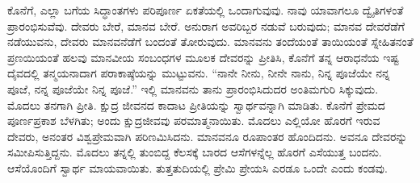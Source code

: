 ಕೊನೆಗೆ, ಎಲ್ಲಾ ಬಗೆಯ ಸಿದ್ಧಾಂತಗಳು ಪರಿಪೂರ್ಣ ಏಕತೆಯಲ್ಲಿ ಒಂದಾಗುವುವು. ನಾವು ಯಾವಾಗಲೂ ದ್ವೈತಿಗಳಂತೆ ಪ್ರಾರಂಭಿಸುವೆವು. ದೇವರು ಬೇರೆ, ಮಾನವ ಬೇರೆ. ಅನುರಾಗ ಅವರಿಬ್ಬರ ನಡುವೆ ಬರುವುದು; ಮಾನವ ದೇವರೆಡೆಗೆ ನಡೆಯುವನು, ದೇವರು ಮಾನವನೆಡೆಗೆ ಬಂದಂತೆ ತೋರುವುದು. ಮಾನವನು ತಂದೆಯಂತೆ ತಾಯಿಯಂತೆ ಸ್ನೇಹಿತನಂತೆ ಪ್ರಣಯಿಯಂತೆ ಹಲವು ಮಾನವೀಯ ಸಂಬಂಧಗಳ ಮೂಲಕ ದೇವರನ್ನು ಪ್ರೀತಿಸಿ, ಕೊನೆಗೆ ತನ್ನ ಆರಾಧನೆಯ ಇಷ್ಟ ದೈವದಲ್ಲಿ ತನ್ಮಯನಾದಾಗ ಪರಾಕಾಷ್ಠೆಯನ್ನು ಮುಟ್ಟುವನು. “ನಾನೇ ನೀನು, ನೀನೇ ನಾನು, ನಿನ್ನ ಪೂಜೆಯೇ ನನ್ನ ಪೂಜೆ, ನನ್ನ ಪೂಜೆಯೇ ನಿನ್ನ ಪೂಜೆ.” ಇಲ್ಲಿ ಮಾನವನು ತಾನು ಪ್ರಾರಂಭಿಸಿದುದರ ಅಂತಿಮಗುರಿ ಸಿಕ್ಕುವುದು. ಮೊದಲು ತನಗಾಗಿ ಪ್ರೀತಿ. ಕ್ಷುದ್ರ ಜೀವನದ ಕಾದಾಟ ಪ್ರೀತಿಯನ್ನು ಸ್ವಾರ್ಥವನ್ನಾಗಿ ಮಾಡಿತು. ಕೊನೆಗೆ ಪ್ರೇಮದ ಪೂರ್ಣಪ್ರಕಾಶ ಬೆಳಗಿತು; ಅಂದು ಕ್ಷುದ್ರಜೀವವು ಪರಮಾತ್ಮನಾಯಿತು. ಮೊದಲು ಎಲ್ಲಿಯೋ ಹೊರಗೆ ಇರುವ ದೇವರು, ಅನಂತರ ವಿಶ್ವಪ್ರೇಮವಾಗಿ ಪರಿಣಮಿಸಿದನು. ಮಾನವನೂ ರೂಪಾಂತರ ಹೊಂದಿದನು. ಅವನೂ ದೇವರನ್ನು ಸಮೀಪಿಸುತ್ತಿದ್ದನು. ಮೊದಲು ತನ್ನಲ್ಲಿ ತುಂಬಿದ್ದ ಕೆಲಸಕ್ಕೆ ಬಾರದ ಆಸೆಗಳನ್ನೆಲ್ಲ ಹೊರಗೆ ಎಸೆಯುತ್ತ ಬಂದನು. ಆಸೆಯೊಂದಿಗೆ ಸ್ವಾರ್ಥ ಮಾಯವಾಯಿತು. ತುತ್ತತುದಿಯಲ್ಲಿ ಪ್ರೇಮಿ ಪ್ರೇಯಸಿ ಎರಡೂ ಒಂದೇ ಎಂದು ಕಂಡವು.


